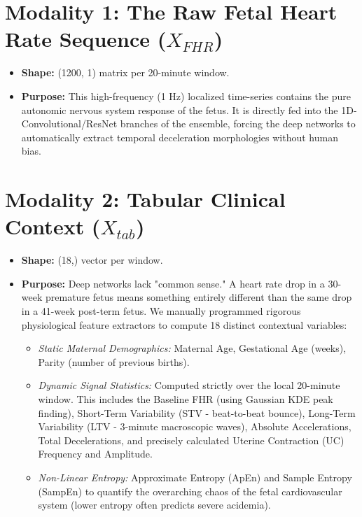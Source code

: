 \documentclass[12pt,a4paper]{report}
\begin{document}
\section{Modality 1: The Raw Fetal Heart Rate Sequence (\texorpdfstring{$X_{FHR}$}{X\_FHR})}
\begin{itemize}
    \item \textbf{Shape:} (1200, 1) matrix per 20-minute window.
    \item \textbf{Purpose:} This high-frequency (1 Hz) localized time-series contains the pure autonomic nervous system response of the fetus. It is directly fed into the 1D-Convolutional/ResNet branches of the ensemble, forcing the deep networks to automatically extract temporal deceleration morphologies without human bias.
\end{itemize}

\section{Modality 2: Tabular Clinical Context (\texorpdfstring{$X_{tab}$}{X\_tab})}
\begin{itemize}
    \item \textbf{Shape:} (18,) vector per window.
    \item \textbf{Purpose:} Deep networks lack "common sense." A heart rate drop in a 30-week premature fetus means something entirely different than the same drop in a 41-week post-term fetus. We manually programmed rigorous physiological feature extractors to compute 18 distinct contextual variables:
    \begin{itemize}
        \item \textit{Static Maternal Demographics:} Maternal Age, Gestational Age (weeks), Parity (number of previous births).
        \item \textit{Dynamic Signal Statistics:} Computed strictly over the local 20-minute window. This includes the Baseline FHR (using Gaussian KDE peak finding), Short-Term Variability (STV - beat-to-beat bounce), Long-Term Variability (LTV - 3-minute macroscopic waves), Absolute Accelerations, Total Decelerations, and precisely calculated Uterine Contraction (UC) Frequency and Amplitude.
        \item \textit{Non-Linear Entropy:} Approximate Entropy (ApEn) and Sample Entropy (SampEn) to quantify the overarching chaos of the fetal cardiovascular system (lower entropy often predicts severe acidemia).
    \end{itemize}
\end{itemize}
\end{document}
